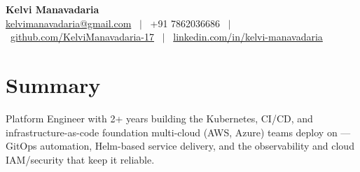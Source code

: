 \documentclass[a4paper,10.999999pt]{article}
\begin{document}
    \pagestyle{empty}



    \begin{center}
    \LARGE{\textbf{Kelvi Manavadaria}} \\[1.5pt]
    {\small
    \href{mailto:kelvimanavadaria@gmail.com}{kelvimanavadaria@gmail.com} \ $|$ \
    +91 7862036686 \ $|$ \
    \href{https://github.com/KelviManavadaria-17}{github.com/KelviManavadaria-17} \ $|$ \
    \href{https://www.linkedin.com/in/kelvi-manavadaria/}{linkedin.com/in/kelvi-manavadaria}
    }
    \end{center}

    \vspace{0.5pt}


    \section{Summary}
Platform Engineer with 2+ years building the Kubernetes, CI/CD, and infrastructure-as-code foundation multi-cloud (AWS, Azure) teams deploy on — GitOps automation, Helm-based service delivery, and the observability and cloud IAM/security that keep it reliable.

\end{document}

